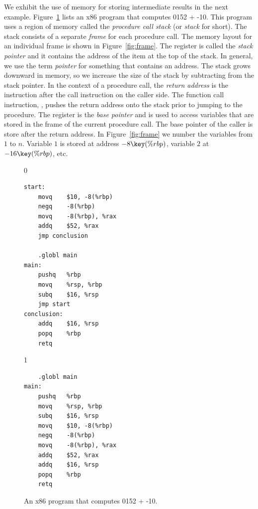 \documentclass[7x10,nocrop]{TimesAPriori_MIT}%
\def\racketEd{0}
\def\pythonEd{1}
\def\edition{1}
\newcommand{\racket}[1]{{\if\edition\racketEd{#1}\fi}}
\newcommand{\python}[1]{{\if\edition\pythonEd #1\fi}}
\begin{document}
We exhibit the use of memory for storing intermediate results in the
next example.  Figure~\ref{fig:p1-x86} lists an x86 program that
computes \racket{}\python{52 + -10}. This program
uses a region of memory called the \emph{procedure call stack} (or
\emph{stack} for
short). 
The stack consists of a separate \emph{frame}
for each procedure call. The memory layout for an individual frame is
shown in Figure~\ref{fig:frame}.  The register  is called the
\emph{stack pointer} and it contains the
address of the item at the top of the stack.  In general, we use the
term \emph{pointer} for something that
contains an address. The stack grows downward in memory, so we
increase the size of the stack by subtracting from the stack pointer.
In the context of a procedure call, the \emph{return
address} is the instruction after the
call instruction on the caller side. The function call instruction,
, pushes the return address onto the stack prior to
jumping to the procedure.  The register  is the \emph{base
pointer} and is used to access variables
that are stored in the frame of the current procedure call.  The base
pointer of the caller is store after the return address. In
Figure~\ref{fig:frame} we number the variables from $1$ to
$n$. Variable $1$ is stored at address $-8\key{(\%rbp)}$, variable $2$
at $-16\key{(\%rbp)}$, etc.

\begin{figure}[tbp]
{\if\edition\racketEd
\begin{lstlisting}
start:
	movq	$10, -8(%rbp)
	negq	-8(%rbp)
	movq	-8(%rbp), %rax
	addq	$52, %rax
	jmp conclusion

	.globl main
main:
	pushq	%rbp
	movq	%rsp, %rbp
	subq	$16, %rsp
	jmp start
conclusion:
	addq	$16, %rsp
	popq	%rbp
	retq
\end{lstlisting}
\fi}
{\if\edition\pythonEd
\begin{lstlisting}
	.globl main
main:
	pushq	%rbp
	movq	%rsp, %rbp
	subq	$16, %rsp
	movq	$10, -8(%rbp)
	negq	-8(%rbp)
	movq	-8(%rbp), %rax
	addq	$52, %rax
	addq	$16, %rsp
	popq	%rbp
	retq
\end{lstlisting}
\fi}
\caption{An x86 program that computes
  \racket{}\python{52 + -10}.}
\label{fig:p1-x86}
\end{figure}
\end{document}
